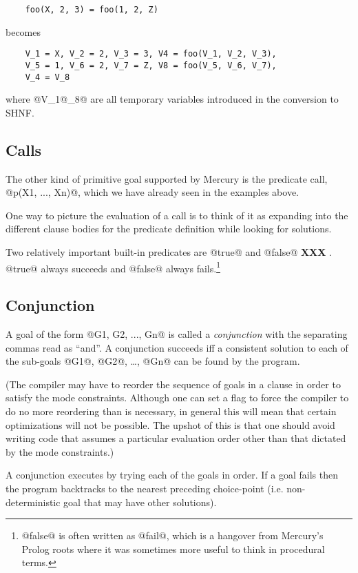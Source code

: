 \documentclass[a4paper,11pt,notitlepage,onecolumn]{article}
\newcommand{\XXX}[1]%
{{\small\textbf{XXX} \emph{#1}}}
\begin{document}
\begin{verbatim}
    foo(X, 2, 3) = foo(1, 2, Z)
\end{verbatim}
becomes
\begin{verbatim}
    V_1 = X, V_2 = 2, V_3 = 3, V4 = foo(V_1, V_2, V_3),
    V_5 = 1, V_6 = 2, V_7 = Z, V8 = foo(V_5, V_6, V_7),
    V_4 = V_8
\end{verbatim}
where @V_1@\ldots@V_8@ are all temporary variables
introduced in the conversion to SHNF.

\subsection{Calls}
The other kind of primitive goal supported by Mercury is the
predicate call, @p(X1, ..., Xn)@, which we have already seen in
the examples above.

One way to picture the evaluation of a call is to think of it
as expanding into the different clause bodies for the
predicate definition while looking for solutions.

Two relatively important built-in predicates are @true@ and
@false@ \XXX{}.  @true@ always succeeds and @false@ always fails.\footnote{@false@ is often written as @fail@, which is a hangover
from Mercury's Prolog roots where it was sometimes more useful
to think in procedural terms.}

\subsection{Conjunction}

A goal of the form @G1, G2, ..., Gn@ is called a \emph{conjunction}
with the separating commas read as ``and''.  A conjunction
succeeds iff a consistent solution to each of the sub-goals @G1@,
@G2@, \ldots, @Gn@ can be found by the program.

(The compiler may have to reorder the sequence of goals in a
clause in order to satisfy the mode constraints.  Although one
can set a flag to force the compiler to do no more reordering
than is necessary, in general this will mean that certain
optimizations will not be possible.  The upshot of this is
that one should avoid writing code that assumes a particular
evaluation order other than that dictated by the mode
constraints.)

A conjunction executes by trying each of the goals in order.
If a goal fails then the program backtracks to the nearest
preceding choice-point (i.e. non-deterministic goal that may
have other solutions).
\end{document}
